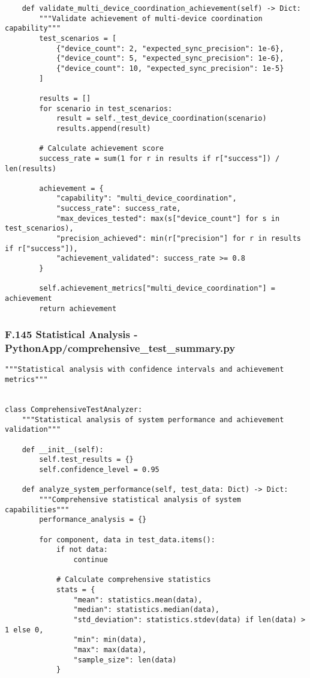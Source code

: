 \documentclass[11pt,a4paper]{report}
\begin{document}
{{\begin{verbatim}
    def validate_multi_device_coordination_achievement(self) -> Dict:
        """Validate achievement of multi-device coordination capability"""
        test_scenarios = [
            {"device_count": 2, "expected_sync_precision": 1e-6},
            {"device_count": 5, "expected_sync_precision": 1e-6},
            {"device_count": 10, "expected_sync_precision": 1e-5}
        ]

        results = []
        for scenario in test_scenarios:
            result = self._test_device_coordination(scenario)
            results.append(result)

        # Calculate achievement score
        success_rate = sum(1 for r in results if r["success"]) / len(results)

        achievement = {
            "capability": "multi_device_coordination",
            "success_rate": success_rate,
            "max_devices_tested": max(s["device_count"] for s in test_scenarios),
            "precision_achieved": min(r["precision"] for r in results if r["success"]),
            "achievement_validated": success_rate >= 0.8
        }

        self.achievement_metrics["multi_device_coordination"] = achievement
        return achievement
\end{verbatim}

\subsubsection{F.145 Statistical Analysis - PythonApp/comprehensive_test_summary.py}

\begin{verbatim}
"""Statistical analysis with confidence intervals and achievement metrics"""


class ComprehensiveTestAnalyzer:
    """Statistical analysis of system performance and achievement validation"""

    def __init__(self):
        self.test_results = {}
        self.confidence_level = 0.95

    def analyze_system_performance(self, test_data: Dict) -> Dict:
        """Comprehensive statistical analysis of system capabilities"""
        performance_analysis = {}

        for component, data in test_data.items():
            if not data:
                continue

            # Calculate comprehensive statistics
            stats = {
                "mean": statistics.mean(data),
                "median": statistics.median(data),
                "std_deviation": statistics.stdev(data) if len(data) > 1 else 0,
                "min": min(data),
                "max": max(data),
                "sample_size": len(data)
            }


\end{verbatim}}}
\end{document}
